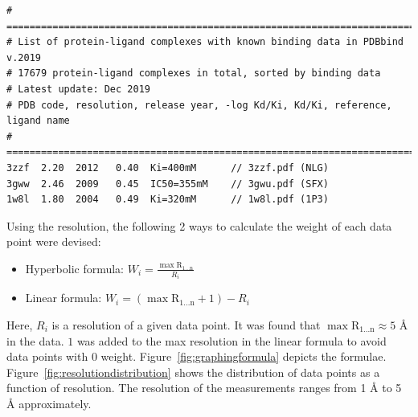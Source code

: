 \documentclass[11pt]{article}
\begin{document}
\begin{verbatim}
# ==============================================================================
# List of protein-ligand complexes with known binding data in PDBbind v.2019
# 17679 protein-ligand complexes in total, sorted by binding data
# Latest update: Dec 2019
# PDB code, resolution, release year, -log Kd/Ki, Kd/Ki, reference, ligand name
# ==============================================================================
3zzf  2.20  2012   0.40  Ki=400mM      // 3zzf.pdf (NLG)
3gww  2.46  2009   0.45  IC50=355mM    // 3gwu.pdf (SFX)
1w8l  1.80  2004   0.49  Ki=320mM      // 1w8l.pdf (1P3)
\end{verbatim}

Using the resolution, the following 2 ways to calculate the weight of each data point were devised:
\begin{itemize}
\item Hyperbolic formula: $  W_i = \frac{ \mathrm{\max{R_{1 ...  n}}}}{R_i}  $
\item Linear formula: $ W_i = (\mathrm{\max{R_{1 ...  n}}} + 1) - R_i $
\end{itemize}

Here, $R_i$ is a resolution of a given data point.
It was found that $\mathrm{\max{R_{1 ...  n}}} \approx 5$ \si{\angstrom} in the data.
$1$ was added to the max resolution in the linear formula to avoid data points with $0$ weight.
Figure~\ref{fig:graphingformula} depicts the formulae.
Figure~\ref{fig:resolutiondistribution} shows the distribution of data points as a function of resolution.
The resolution of the measurements ranges from 1 \si{\angstrom} to 5 \si{\angstrom} approximately.
\end{document}
